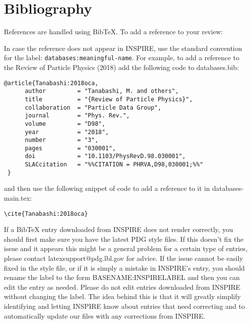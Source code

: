 \section{Bibliography}

References are handled using BibTeX. To add a reference to your review:
In case the reference does not appear in INSPIRE, use the standard convention for the label: {\tt databases:meaningful-name}.
For example, to add a reference to the Review of Particle Physics (2018) 
add the following code to databases.bib:
\begin{verbatim}
@article{Tanabashi:2018oca,
      author         = "Tanabashi, M. and others",
      title          = "{Review of Particle Physics}",
      collaboration  = "Particle Data Group",
      journal        = "Phys. Rev.",
      volume         = "D98",
      year           = "2018",
      number         = "3",
      pages          = "030001",
      doi            = "10.1103/PhysRevD.98.030001",
      SLACcitation   = "%%CITATION = PHRVA,D98,030001;%%"
 }
\end{verbatim}
and then use the following snippet of code to add a reference to it in databases-main.tex:
\begin{verbatim}
\cite{Tanabashi:2018oca}
\end{verbatim}
If a BibTeX entry downloaded from INSPIRE does not render correctly, you should first make sure you have the latest PDG style files. If this doesn't fix the issue and it appears this might be a general problem for a certain type of entries, please contact latexsupport@pdg.lbl.gov for advice. If the issue cannot be easily fixed in the style file, or if it is simply a mistake in INSPIRE's entry, you should rename the label to the form BASENAME:INSPIRELABEL and then you can edit the entry as needed.  Please do not edit entries downloaded from INSPIRE without changing the label. The idea behind this is that it will greatly simplify identifying and letting INSPIRE know about entries that need correcting and to automatically update our files with any corrections from INSPIRE. 

